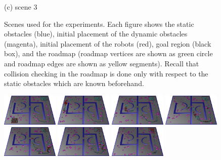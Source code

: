 \documentclass[letterpaper, 10pt, conference]{ieeeconf}
\begin{document}
\begin{figure}
(c) scene 3
\caption{Scenes used for the experiments. Each figure shows the static
  obstacles (blue), initial placement of the dynamic obstacles (magenta), initial placement of
  the robots (red), goal region (black box), and the roadmap (roadmap
  vertices are shown as green circle and roadmap edges are shown as
  yellow segments). Recall that collision checking in the roadmap is
  done only with respect to the static obstacles which are known
  beforehand.}
\label{fig:Scenes}
\end{figure}

\begin{figure}
\centering
\includegraphics[width=0.24\textwidth]{usef/figA_Inter1_scaled.jpg}
\includegraphics[width=0.24\textwidth]{usef/figA_Inter2_scaled.jpg}
\includegraphics[width=0.24\textwidth]{usef/figA_Inter3_scaled.jpg}
\includegraphics[width=0.24\textwidth]{usef/figA_Inter4_scaled.jpg}\\[2mm]
\includegraphics[width=0.24\textwidth]{usef/figA_Inter5_scaled.jpg}
\includegraphics[width=0.24\textwidth]{usef/figA_Inter6_scaled.jpg}
\includegraphics[width=0.24\textwidth]{usef/figA_Inter7_scaled.jpg}

\end{figure}
\end{document}
